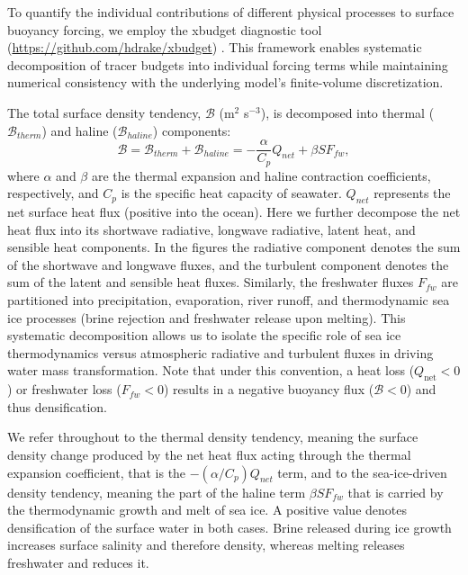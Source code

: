 \documentclass[pdflatex,sn-nature]{sn-jnl}
\begin{document}
To quantify the individual contributions of different physical processes to surface buoyancy forcing, we employ the xbudget diagnostic tool (\url{https://github.com/hdrake/xbudget}) \cite{drake2025water}. This framework enables systematic decomposition of tracer budgets into individual forcing terms while maintaining numerical consistency with the underlying model's finite-volume discretization.

The total surface density tendency, $\mathcal{B}$ (m$^2$ s$^{-3}$), is decomposed into thermal ($\mathcal{B}_{therm}$) and haline ($\mathcal{B}_{haline}$) components:
\begin{equation}
\mathcal{B} = \mathcal{B}_{therm} + \mathcal{B}_{haline} = -\frac{\alpha}{C_p} Q_{net} + \beta S F_{fw},
\end{equation}
where $\alpha$ and $\beta$ are the thermal expansion and haline contraction coefficients, respectively, and $C_p$ is the specific heat capacity of seawater. $Q_{net}$ represents the net surface heat flux (positive into the ocean). Here we further decompose the net heat flux into its shortwave radiative, longwave radiative, latent heat, and sensible heat components. In the figures the radiative component denotes the sum of the shortwave and longwave fluxes, and the turbulent component denotes the sum of the latent and sensible heat fluxes. Similarly, the freshwater fluxes $F_{fw}$ are partitioned into precipitation, evaporation, river runoff, and thermodynamic sea ice processes (brine rejection and freshwater release upon melting). This systematic decomposition allows us to isolate the specific role of sea ice thermodynamics versus atmospheric radiative and turbulent fluxes in driving water mass transformation. Note that under this convention, a heat loss ($Q_{\text{net}} < 0$) or freshwater loss ($F_{fw} < 0$) results in a negative buoyancy flux ($\mathcal{B} < 0$) and thus densification.

We refer throughout to the thermal density tendency, meaning the surface density change produced by the net heat flux acting through the thermal expansion coefficient, that is the $-\left(\alpha/C_p\right)Q_{net}$ term, and to the sea-ice-driven density tendency, meaning the part of the haline term $\beta S F_{fw}$ that is carried by the thermodynamic growth and melt of sea ice. A positive value denotes densification of the surface water in both cases. Brine released during ice growth increases surface salinity and therefore density, whereas melting releases freshwater and reduces it.
\end{document}
